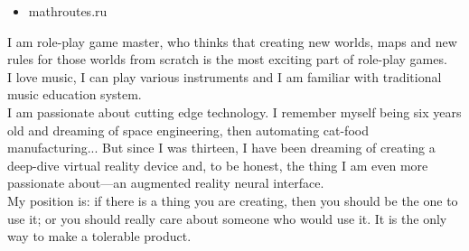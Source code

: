\documentclass[10pt,a4paper,ragged2e,withhyper]{altacv}
\begin{document}


\makecvheader


\begin{paracol}{2}

\begin{itemize}
\item mathroutes.ru
\end{itemize}



\divider


\medskip

I am role-play game master, who thinks that creating new worlds, maps and new rules for those worlds from scratch is the most exciting part of role-play games. \\
I love music, I can play various instruments and I am familiar with traditional music education system.\\
\divider
{}
I am passionate about cutting edge technology. I remember myself being six years old and dreaming of space engineering, then automating cat-food manufacturing... But since I was thirteen, I have been dreaming of creating a deep-dive virtual reality device and, to be honest, the thing I am even more passionate about—an augmented reality neural interface.  \\
\divider
{}
My position is: if there is a thing you are creating, then you should be the one to use it; or you should really care about someone who would use it. It is the only way to make a tolerable product. \\
\divider
\newpage
{}


\end{paracol}
\end{document}
